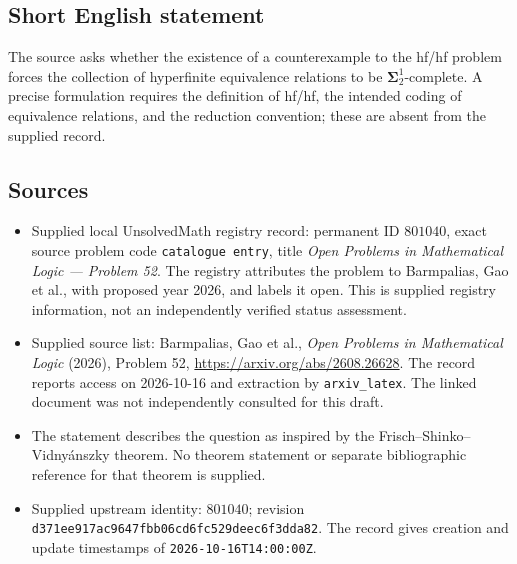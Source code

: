 \documentclass[11pt]{article}
\begin{document}
\subsection{Short English statement}
The source asks whether the existence of a counterexample to the hf/hf problem forces the collection of hyperfinite equivalence relations to be \(\boldsymbol{\Sigma}^{1}_{2}\)-complete. A precise formulation requires the definition of hf/hf, the intended coding of equivalence relations, and the reduction convention; these are absent from the supplied record.
\subsection{Sources}
\begin{itemize}
\item Supplied local UnsolvedMath registry record: permanent ID \(801040\), exact source problem code \texttt{catalogue entry}, title \emph{Open Problems in Mathematical Logic --- Problem 52}. The registry attributes the problem to Barmpalias, Gao et al., with proposed year 2026, and labels it open. This is supplied registry information, not an independently verified status assessment.
\item Supplied source list: Barmpalias, Gao et al., \emph{Open Problems in Mathematical Logic} (2026), Problem 52, \url{https://arxiv.org/abs/2608.26628}. The record reports access on 2026-10-16 and extraction by \texttt{arxiv\_latex}. The linked document was not independently consulted for this draft.
\item The statement describes the question as inspired by the Frisch--Shinko--Vidny\'anszky theorem. No theorem statement or separate bibliographic reference for that theorem is supplied.
\item Supplied upstream identity: \(801040\); revision \texttt{d371ee917ac9647fbb06cd6fc529deec6f3dda82}. The record gives creation and update timestamps of \texttt{2026-10-16T14:00:00Z}.
\end{itemize}
\end{document}
